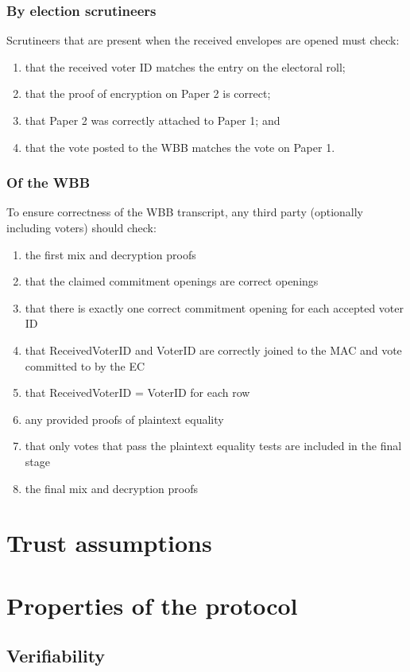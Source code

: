\documentclass[11pt,twoside,a4paper]{article}
\theoremstyle{definition}
\begin{document}
\subsubsection{By election scrutineers}
Scrutineers that are present when the received envelopes are opened must check:
\begin{enumerate}
	\item that the received voter ID matches the entry on the electoral roll;
	\item that the proof of encryption on Paper 2 is correct;
	\item that Paper 2 was correctly attached to Paper 1; and
	\item that the vote posted to the WBB matches the vote on Paper 1.
\end{enumerate}

\subsubsection{Of the WBB}
To ensure correctness of the WBB transcript, any third party (optionally including voters) should check:
\begin{enumerate}
	\item the first mix and decryption proofs
	\item that the claimed commitment openings are correct openings
	\item that there is exactly one correct commitment opening for each accepted voter ID
	\item that ReceivedVoterID and VoterID are correctly joined to the MAC and vote committed to by the EC
	\item that ReceivedVoterID = VoterID for each row
	\item any provided proofs of plaintext equality
	\item that only votes that pass the plaintext equality tests are included in the final stage
	\item the final mix and decryption proofs
\end{enumerate}
\section{Trust assumptions}
\section{Properties of the protocol}\label{sec-properties}
\subsection{Verifiability}
\end{document}
